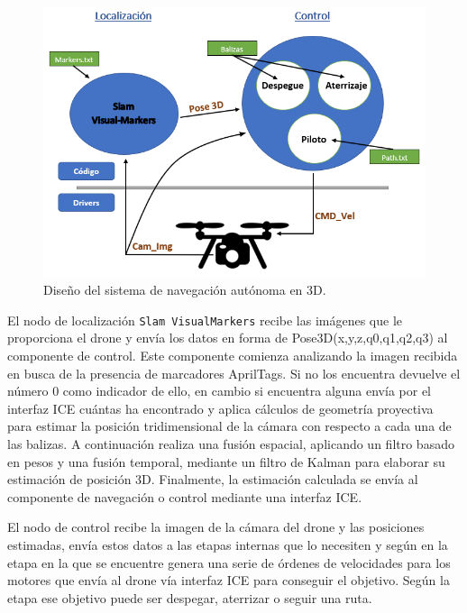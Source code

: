 \begin{figure}[H]
	\begin{center}
		\includegraphics[width=1\textwidth]{imag/IMG80.PNG}
				\caption{Diseño del sistema de navegación autónoma en 3D.}
		\label{fig:Esquema representativo.}	
	\end{center}
\end{figure}

\hspace{1cm} El nodo de localización \texttt{Slam VisualMarkers} recibe las imágenes que le proporciona el drone y envía los datos en forma de Pose3D(x,y,z,q0,q1,q2,q3) al componente de control. Este componente comienza analizando la imagen recibida en busca de la presencia de marcadores AprilTags. Si no los encuentra devuelve el número 0 como indicador de ello, en cambio si encuentra alguna envía por el interfaz ICE cuántas ha encontrado y aplica cálculos de geometría proyectiva para estimar la posición tridimensional de la cámara con respecto a cada una de las balizas. A continuación realiza una fusión espacial, aplicando un filtro basado en pesos y una fusión temporal, mediante un filtro de Kalman para elaborar su estimación de posición 3D. Finalmente, la estimación calculada se envía al componente de navegación o control mediante una interfaz ICE.

\hspace{1cm} El nodo de control recibe la imagen de la cámara del drone y las posiciones estimadas, envía estos datos a las etapas internas que lo necesiten y según en la etapa en la que se encuentre genera una serie de órdenes de velocidades para los motores que envía al drone vía interfaz ICE para conseguir el objetivo. Según la etapa ese objetivo puede ser despegar, aterrizar o seguir una ruta.

